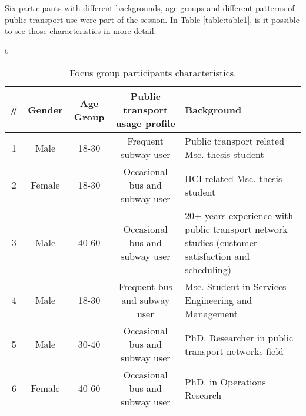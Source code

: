 Six participants with different backgrounds, age groups and different patterns of public transport use were part of the session. In Table \ref{table:table1}, is it possible to see those characteristics in more detail.

\begin{table}{t}

\begin{center}
\begin{tabular}{ c c c c p{5cm} }

  \hline 
  \textbf{\#} & \textbf{Gender} & \textbf{Age Group} & \textbf{Public transport usage profile} & \textbf{Background} \\
  \hline 
  1 & Male & 18-30 & Frequent subway user & Public transport related Msc. thesis
   student \\
  \hline
  2 & Female & 18-30 & Occasional bus and subway user & HCI related Msc. thesis student \\
  \hline
  3 & Male & 40-60 & Occasional bus and subway user & 20+ years experience with public transport
  network studies (customer satisfaction
   and scheduling) \\ 
  \hline
  4 & Male & 18-30 & Frequent bus and subway user & Msc. Student in Services Engineering
   and Management\\
  \hline
  5 & Male & 30-40 & Occasional bus and subway user & PhD. Researcher in public transport
   networks field\\
  \hline
  6 & Female & 40-60 & Occasional bus and subway user & PhD. in Operations Research\\
  \hline
\end{tabular}
\caption{Focus group participants characteristics.}
\label{tab:table1}
\end{center}
\end{table}



